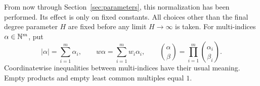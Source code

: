 From now through Section~\ref{sec:parameters}, this normalization has
been performed. Its effect is only on fixed constants.
All choices other than the final degree parameter \(H\) are fixed
before any limit \(H\to\infty\) is taken.
For multi-indices \(\alpha\in\mathbb N^m\), put
\[
 |\alpha|=\sum_{i=1}^m\alpha_i,\qquad
 w\alpha=\sum_{i=1}^m w_i\alpha_i,\qquad
 \binom{\alpha}{\beta}=\prod_{i=1}^m\binom{\alpha_i}{\beta_i}.
\]
Coordinatewise inequalities between multi-indices have their usual
meaning. Empty products and empty least common multiples equal \(1\).
